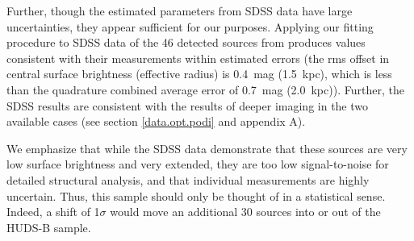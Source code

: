 \documentclass[twocolumn]{aastex6}
\begin{document}
Further, though the estimated parameters from SDSS data have large uncertainties, they appear sufficient for our purposes. Applying our fitting procedure to SDSS data of the 46 detected sources from \cite{vandokkum15a} produces values consistent with their measurements within estimated errors (the rms offset in central surface brightness (effective radius) is 0.4~mag (1.5~kpc), which is less than the quadrature combined average error of 0.7~mag (2.0~kpc)). Further, the SDSS results are consistent with the results of deeper imaging in the two available cases (see section \ref{data.opt.podi} and appendix A). %

We emphasize that while the SDSS data demonstrate that these sources are very low surface brightness and very extended, they
are too low signal-to-noise for detailed structural analysis, and that individual measurements are highly uncertain. Thus, this sample should only be thought of in a statistical sense. Indeed, a shift of 1$\sigma$ would move an additional 30 sources into or out of the HUDS-B sample. 
\end{document}
